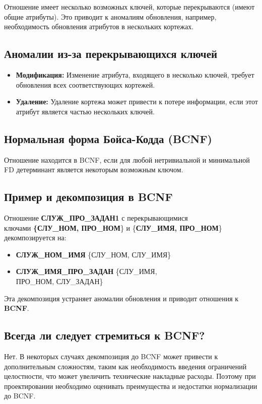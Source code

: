 \documentclass[a4paper,12pt]{article}
\begin{document}
Отношение имеет несколько возможных ключей, которые перекрываются (имеют общие атрибуты). Это приводит к аномалиям обновления, например, необходимость обновления атрибутов в нескольких кортежах.

\subsection{Аномалии из-за перекрывающихся ключей}

\begin{itemize}
    \item \textbf{Модификация:} Изменение атрибута, входящего в несколько ключей, требует обновления всех соответствующих кортежей.
    \item \textbf{Удаление:} Удаление кортежа может привести к потере информации, если этот атрибут является частью нескольких ключей.
\end{itemize}

\subsection{Нормальная форма Бойса-Кодда (BCNF)}

Отношение находится в BCNF, если для любой нетривиальной и минимальной FD детерминант является некоторым возможным ключом.

\subsection{Пример и декомпозиция в BCNF}

Отношение \textbf{СЛУЖ\_ПРО\_ЗАДАН1} с перекрывающимися \\ ключами \textbf{\{СЛУ\_НОМ, ПРО\_НОМ}\} и \{\textbf{СЛУ\_ИМЯ, ПРО\_НОМ}\} декомпозируется на:
\begin{itemize}
    \item \textbf{СЛУЖ\_НОМ\_ИМЯ} \{СЛУ\_НОМ, СЛУ\_ИМЯ\}
    \item \textbf{СЛУЖ\_ИМЯ\_ПРО\_ЗАДАН} \{СЛУ\_ИМЯ, \\ ПРО\_НОМ, СЛУ\_ЗАДАН\}
\end{itemize}
Эта декомпозиция устраняет аномалии обновления и приводит отношения к \textbf{BCNF}.

\subsection{Всегда ли следует стремиться к BCNF?}

Нет. В некоторых случаях декомпозиция до BCNF может привести к дополнительным сложностям, таким как необходимость введения ограничений целостности, что может увеличить технические накладные расходы. Поэтому при проектировании необходимо оценивать преимущества и недостатки нормализации до BCNF.
\end{document}
